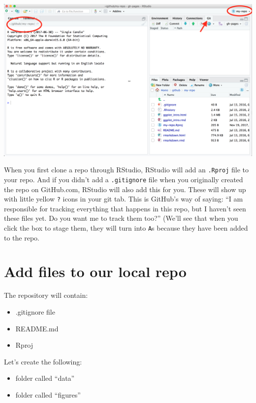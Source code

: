 \documentclass[]{book}
\providecommand{\tightlist}{%
  \setlength{\itemsep}{0pt}\setlength{\parskip}{0pt}}
\begin{document}
\includegraphics{img/RStudio_IDE_git.png}

When you first clone a repo through RStudio, RStudio will add an \texttt{.Rproj} file to your repo. And if you didn't add a \texttt{.gitignore} file when you originally created the repo on GitHub.com, RStudio will also add this for you. These will show up with little yellow \texttt{?} icons in your git tab. This is GitHub's way of saying: ``I am responsible for tracking everything that happens in this repo, but I haven't seen these files yet. Do you want me to track them too?'' (We'll see that when you click the box to stage them, they will turn into \texttt{A}s because they have been added to the repo.

\hypertarget{add-files-to-our-local-repo}{%
\section{Add files to our local repo}\label{add-files-to-our-local-repo}}

The repository will contain:

\begin{itemize}
\tightlist
\item
  .gitignore file
\item
  README.md
\item
  Rproj
\end{itemize}

Let's create the following:

\begin{itemize}
\tightlist
\item
  folder called ``data''
\item
  folder called ``figures''
\end{itemize}
\end{document}

